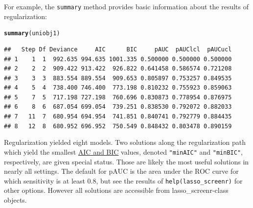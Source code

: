 \documentclass[11pt]{report}\usepackage[]{graphicx}\usepackage[]{xcolor}
\makeatletter
\newcommand{\hlstd}[1]{\textcolor[rgb]{0.345,0.345,0.345}{#1}}%
\newcommand{\hlkwd}[1]{\textcolor[rgb]{0.737,0.353,0.396}{\textbf{#1}}}%
\newenvironment{kframe}{%
 \def\at@end@of@kframe{}%
 \ifinner\ifhmode%
  \def\at@end@of@kframe{\end{minipage}}%
  \begin{minipage}{\columnwidth}%
 \fi\fi%
 \def\FrameCommand##1{\hskip\@totalleftmargin \hskip-\fboxsep
 \colorbox{shadecolor}{##1}\hskip-\fboxsep
     \hskip-\linewidth \hskip-\@totalleftmargin \hskip\columnwidth}%
 \MakeFramed {\advance\hsize-\width
   \@totalleftmargin\z@ \linewidth\hsize
   \@setminipage}}%
 {\par\unskip\endMakeFramed%
 \at@end@of@kframe}
\newenvironment{knitrout}{}{} %
\makeatother
\begin{document}
For example, the \verb|summary| method provides basic information about the results
of regularization:
\begin{knitrout}
\color{fgcolor}\begin{kframe}
\begin{alltt}
\hlkwd{summary}\hlstd{(uniobj1)}
\end{alltt}
\begin{verbatim}
##   Step Df Deviance     AIC      BIC     pAUC  pAUClcl  pAUCucl
## 1    1  1  992.635 994.635 1001.335 0.500000 0.500000 0.500000
## 2    2  2  909.422 913.422  926.822 0.641458 0.586574 0.721208
## 3    3  3  883.554 889.554  909.653 0.805897 0.753257 0.849535
## 4    5  4  738.400 746.400  773.198 0.810232 0.755923 0.859063
## 5    7  5  717.198 727.198  760.696 0.830873 0.778954 0.876975
## 6    8  6  687.054 699.054  739.251 0.838530 0.792072 0.882033
## 7   11  7  680.954 694.954  741.851 0.840741 0.792779 0.884435
## 8   12  8  680.952 696.952  750.549 0.848432 0.803478 0.890159
\end{verbatim}
\end{kframe}
\end{knitrout}
Regularization yielded eight models. Two solutions along the
regularization path which yield the smallest
\href{https://docs.displayr.com/wiki/Information_Criteria}{AIC and
BIC} values, denoted \verb|"minAIC"| and \verb|"minBIC"|,
respectively, are given special status.  Those are likely the most
useful solutions in nearly all settings.  The default for pAUC is the
area under the ROC curve for which sensitivity is at least 0.8, but
see the results of \verb|help(lasso_screenr)| for other
options. However all solutions are accessible from
\textsf{lasso\_screenr}-class objects.
\end{document}
